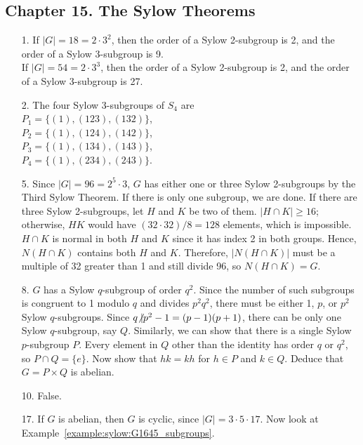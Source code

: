\subsection*{Chapter 15. The Sylow Theorems}
 
{\small
\begin{itemize}
 
\item[1.]
If $|G| = 18 = 2 \cdot 3^2$, then the order of a Sylow 2-subgroup is 2,
and the order of a Sylow 3-subgroup is 9. \\
If $|G| = 54 = 2 \cdot 3^3$, then the order of a Sylow 2-subgroup is 2,
and the order of a Sylow 3-subgroup is 27. 
 
 
\item[2.]
The four Sylow 3-subgroups of $S_4$ are \\
$P_1 = \{ (1), (123), (132) \}$,\\
$P_2 = \{ (1), (124), (142) \}$,\\
$P_3 = \{ (1), (134), (143) \}$,\\
$P_4 = \{ (1), (234), (243) \}$.
 
 
\item[5.]
Since $|G| = 96 = 2^5 \cdot 3$, $G$ has either one or three Sylow
2-subgroups by the Third Sylow Theorem. If there is only one subgroup,
we are done. If there are three Sylow 2-subgroups, let $H$ and $K$ be two
of them. $|H \cap K| \geq 16$; otherwise, $HK$ would have $(32 \cdot
32)/8 = 128$ elements, which is impossible. $H \cap K$ is normal in
both $H$ and $K$ since it has index 2 in both groups. Hence, $N(H \cap
K)$ contains both $H$ and $K$. Therefore, $|N(H \cap K)|$ must be a
multiple of 32 greater than 1 and still divide 96, so $N( H \cap K)
= G$. 
 
 
\item[8.]
$G$ has a Sylow $q$-subgroup of order $q^2$. Since the number of such
subgroups is congruent to 1 modulo $q$ and divides $p^2 q^2$, there
must be either 1, $p$, or $p^2$ Sylow $q$-subgroups. 
Since $q {\not{\mid}}
p^2 -1 = (p-1)(p + 1)$, 
there can be only one Sylow $q$-subgroup, say
$Q$. Similarly, we can show that there is a single Sylow $p$-subgroup
$P$. Every element in $Q$ other than the identity has order $q$ or
$q^2$, so $P \cap Q = \{ e \}$. Now show that $hk = kh$ for $h \in P$
and $k \in Q$. Deduce that $G = P \times Q$ is abelian.
 
 
\item[10.]
False.
 
 
\item[17.]
If $G$ is abelian, then $G$ is cyclic, since $|G| = 3 \cdot 5 \cdot
17$. Now look at Example~\ref{example:sylow:G1645_subgroups}.
 

\end{itemize}}
